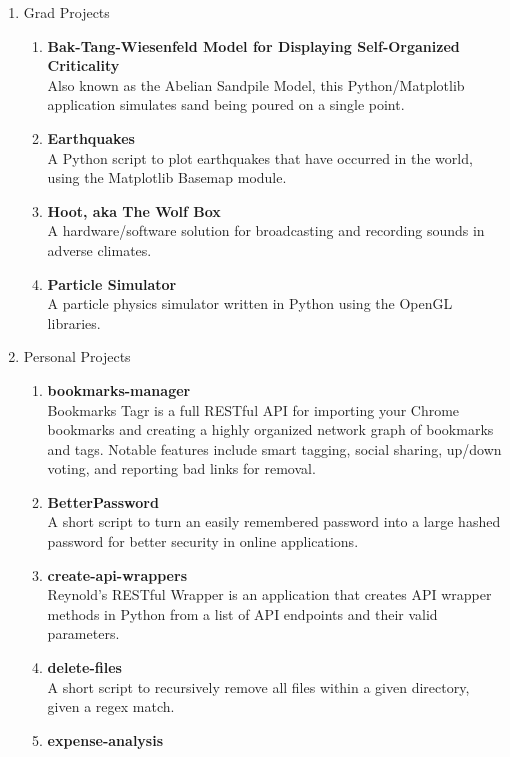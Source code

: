 \documentclass[oneside]{article}%
\begin{document}
\begin{enumerate}[]
	\item \large{Grad Projects}
		\small
		\begin{enumerate}[]
			\item \textbf{Bak-Tang-Wiesenfeld Model for Displaying Self-Organized Criticality}\\
				Also known as the Abelian Sandpile Model, this Python/Matplotlib application simulates sand being poured on a single point.
			\item \textbf{Earthquakes}\\
				A Python script to plot earthquakes that have occurred in the world, using the Matplotlib Basemap module.
			\item \textbf{Hoot, aka The Wolf Box}\\
				A hardware/software solution for broadcasting and recording sounds in adverse climates.
			\item \textbf{Particle Simulator}\\
				A particle physics simulator written in Python using the OpenGL libraries.
		\end{enumerate}
	\item \large{Personal Projects}
		\small
		\begin{enumerate}[]
			\item \textbf{bookmarks-manager}\\
				Bookmarks Tagr\textsuperscript{\textcopyright} is a full RESTful API for importing your Chrome bookmarks and creating a highly organized network graph of bookmarks and tags. Notable features include smart tagging, social sharing, up/down voting, and reporting bad links for removal.
			\item \textbf{BetterPassword}\\
				A short script to turn an easily remembered password into a large hashed password for better security in online applications.
			\item \textbf{create-api-wrappers}\\
				Reynold's RESTful Wrapper\textsuperscript{\textcopyright} is an application that creates API wrapper methods in Python from a list of API endpoints and their valid parameters.
			\item \textbf{delete-files}\\
				A short script to recursively remove all files within a given directory, given a regex match.
			\item \textbf{expense-analysis}\\

\end{enumerate}
\end{enumerate}
\end{document}
